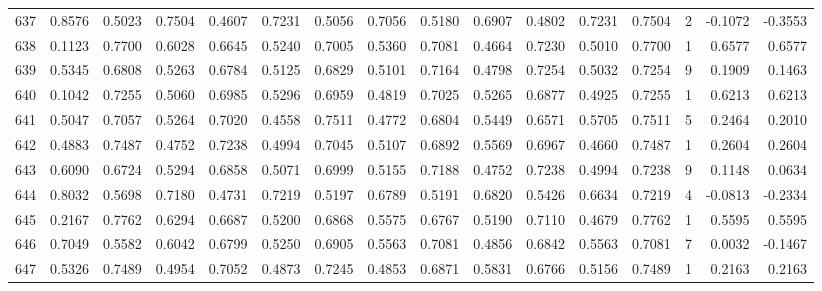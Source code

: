 \begin{tabular}{lrrrrrrrrrrrrrrr}
637 &      0.8576 &  0.5023 &  0.7504 &  0.4607 &  0.7231 &  0.5056 &  0.7056 &  0.5180 &  0.6907 &  0.4802 &   0.7231 &     0.7504 &      2 &                   -0.1072 &                    -0.3553 \\
638 &      0.1123 &  0.7700 &  0.6028 &  0.6645 &  0.5240 &  0.7005 &  0.5360 &  0.7081 &  0.4664 &  0.7230 &   0.5010 &     0.7700 &      1 &                    0.6577 &                     0.6577 \\
639 &      0.5345 &  0.6808 &  0.5263 &  0.6784 &  0.5125 &  0.6829 &  0.5101 &  0.7164 &  0.4798 &  0.7254 &   0.5032 &     0.7254 &      9 &                    0.1909 &                     0.1463 \\
640 &      0.1042 &  0.7255 &  0.5060 &  0.6985 &  0.5296 &  0.6959 &  0.4819 &  0.7025 &  0.5265 &  0.6877 &   0.4925 &     0.7255 &      1 &                    0.6213 &                     0.6213 \\
641 &      0.5047 &  0.7057 &  0.5264 &  0.7020 &  0.4558 &  0.7511 &  0.4772 &  0.6804 &  0.5449 &  0.6571 &   0.5705 &     0.7511 &      5 &                    0.2464 &                     0.2010 \\
642 &      0.4883 &  0.7487 &  0.4752 &  0.7238 &  0.4994 &  0.7045 &  0.5107 &  0.6892 &  0.5569 &  0.6967 &   0.4660 &     0.7487 &      1 &                    0.2604 &                     0.2604 \\
643 &      0.6090 &  0.6724 &  0.5294 &  0.6858 &  0.5071 &  0.6999 &  0.5155 &  0.7188 &  0.4752 &  0.7238 &   0.4994 &     0.7238 &      9 &                    0.1148 &                     0.0634 \\
644 &      0.8032 &  0.5698 &  0.7180 &  0.4731 &  0.7219 &  0.5197 &  0.6789 &  0.5191 &  0.6820 &  0.5426 &   0.6634 &     0.7219 &      4 &                   -0.0813 &                    -0.2334 \\
645 &      0.2167 &  0.7762 &  0.6294 &  0.6687 &  0.5200 &  0.6868 &  0.5575 &  0.6767 &  0.5190 &  0.7110 &   0.4679 &     0.7762 &      1 &                    0.5595 &                     0.5595 \\
646 &      0.7049 &  0.5582 &  0.6042 &  0.6799 &  0.5250 &  0.6905 &  0.5563 &  0.7081 &  0.4856 &  0.6842 &   0.5563 &     0.7081 &      7 &                    0.0032 &                    -0.1467 \\
647 &      0.5326 &  0.7489 &  0.4954 &  0.7052 &  0.4873 &  0.7245 &  0.4853 &  0.6871 &  0.5831 &  0.6766 &   0.5156 &     0.7489 &      1 &                    0.2163 &                     0.2163 \\

\end{tabular}
